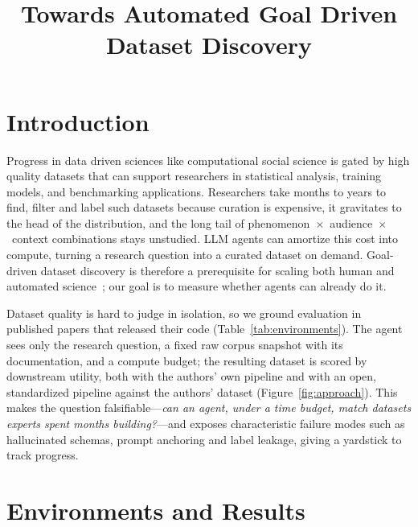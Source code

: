 \documentclass{article}
\title{Towards Automated Goal Driven Dataset Discovery}
\begin{document}
\maketitle

\section{Introduction}
Progress in data driven sciences like computational social science is gated by high quality datasets that can support researchers in statistical analysis, training models, and benchmarking applications. Researchers take months to years to find, filter and label such datasets because curation is expensive, it gravitates to the head of the distribution, and the long tail of
phenomenon~$\times$~audience~$\times$~context combinations stays unstudied. LLM agents can amortize this cost into
compute, turning a research question into a curated dataset on demand. Goal-driven dataset discovery is therefore a
prerequisite for scaling both human and automated science~\cite{gupta_accelerating_2026}; our goal is to measure
whether agents can already do it.

Dataset quality is hard to judge in isolation, so we ground evaluation in published papers that released their code
(Table~\ref{tab:environments}). The agent sees only the research question, a fixed raw corpus snapshot with its
documentation, and a compute budget; the resulting dataset is scored by downstream utility, both with the authors'
own pipeline and with an open, standardized pipeline against the authors' dataset (Figure~\ref{fig:approach}). This
makes the question falsifiable---\emph{can an agent, under a time budget, match datasets experts spent months
building?}---and exposes characteristic failure modes such as hallucinated schemas, prompt anchoring and label
leakage, giving a yardstick to track progress.



\section{Environments and Results}

\end{document}
